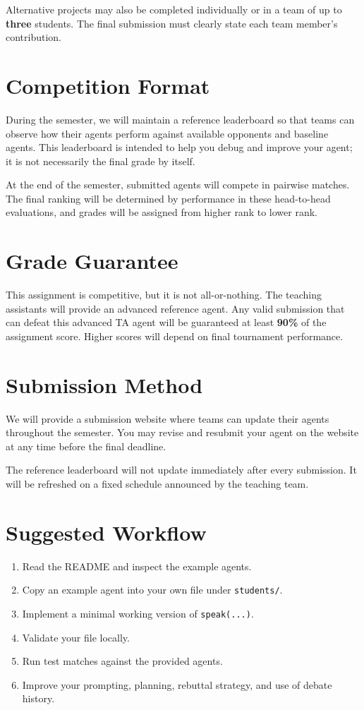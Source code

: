 \documentclass[11pt]{article}
\begin{document}
Alternative projects may also be completed individually or in a team of up to \textbf{three} students. The final submission must clearly state each team member's contribution.

\section*{Competition Format}

During the semester, we will maintain a reference leaderboard so that teams can observe how their agents perform against available opponents and baseline agents. This leaderboard is intended to help you debug and improve your agent; it is not necessarily the final grade by itself.

At the end of the semester, submitted agents will compete in pairwise matches. The final ranking will be determined by performance in these head-to-head evaluations, and grades will be assigned from higher rank to lower rank.

\section*{Grade Guarantee}

This assignment is competitive, but it is not all-or-nothing. The teaching assistants will provide an advanced reference agent. Any valid submission that can defeat this advanced TA agent will be guaranteed at least \textbf{90\%} of the assignment score. Higher scores will depend on final tournament performance.

\section*{Submission Method}

We will provide a submission website where teams can update their agents throughout the semester. You may revise and resubmit your agent on the website at any time before the final deadline.

The reference leaderboard will not update immediately after every submission. It will be refreshed on a fixed schedule announced by the teaching team.

\section*{Suggested Workflow}

\begin{enumerate}
    \item Read the README and inspect the example agents.
    \item Copy an example agent into your own file under \texttt{students/}.
    \item Implement a minimal working version of \texttt{speak(...)}.
    \item Validate your file locally.
    \item Run test matches against the provided agents.
    \item Improve your prompting, planning, rebuttal strategy, and use of debate history.
\end{enumerate}
\end{document}
